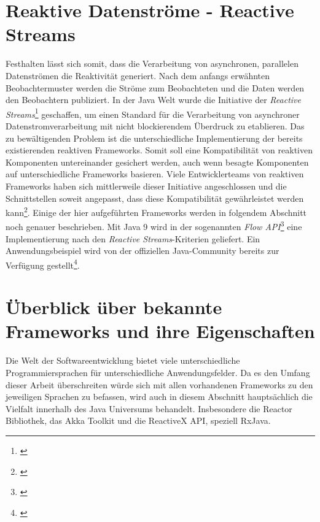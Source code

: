 \section{Reaktive Datenströme - Reactive Streams}
Festhalten lässt sich somit, dass die Verarbeitung von asynchronen, parallelen Datenströmen die Reaktivität generiert. Nach dem anfangs erwähnten Beobachtermuster werden die Ströme zum Beobachteten und die Daten werden den Beobachtern publiziert. In der Java Welt wurde die Initiative der \textit{Reactive Streams}\footnote{\cite{reactivestreams}} geschaffen, um einen Standard für die Verarbeitung von asynchroner Datenstromverarbeitung mit nicht blockierendem Überdruck zu etablieren. Das zu bewältigenden Problem ist die unterschiedliche Implementierung der bereits existierenden reaktiven Frameworks. Somit soll eine Kompatibilität von reaktiven Komponenten untereinander gesichert werden, auch wenn besagte Komponenten auf unterschiedliche Frameworks basieren. Viele Entwicklerteams von reaktiven Frameworks haben sich mittlerweile dieser Initiative angeschlossen und die Schnittstellen soweit angepasst, dass diese Kompatibilität gewährleistet werden kann\footnote{\cite{rs.implementations}}. Einige der hier aufgeführten Frameworks werden in folgendem Abschnitt noch genauer beschrieben. Mit Java 9 wird in der sogenannten \textit{Flow API}\footnote{\cite{fl.apidoc}} eine Implementierung nach den \textit{Reactive Streams}-Kriterien geliefert. Ein Anwendungsbeispiel wird von der offiziellen Java-Community bereits zur Verfügung gestellt\footnote{\cite{flowex}}.  
\section{Überblick über bekannte Frameworks und ihre Eigenschaften}
Die Welt der Softwareentwicklung bietet viele unterschiedliche Programmiersprachen für unterschiedliche Anwendungsfelder. Da es den Umfang dieser Arbeit überschreiten würde sich mit allen vorhandenen Frameworks zu den jeweiligen Sprachen zu befassen, wird auch in diesem Abschnitt hauptsächlich die Vielfalt innerhalb des Java Universums behandelt. Insbesondere die Reactor Bibliothek, das Akka Toolkit und die ReactiveX API, speziell RxJava.

